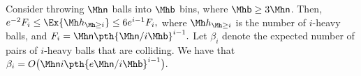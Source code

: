\begin{lemma}%
    Consider throwing $\nballs$ balls into $\nbins$ bins, where
    $\nbins \geq 3 \nballs$. Then,
    \begin{math}
        e^{-2} F_i \leq%
        \Ex{\NHX{i}} %
        \leq 6e^{i-1} F_i,
    \end{math}
    where $\NHX{i}$ is the number of $i$-heavy balls, and
    \begin{math}
        F_i = \nballs \pth{{\nballs}/{i \nbins}}^{i-1}.
    \end{math}
    Let $\beta_i$ denote the expected number of pairs of $i$-heavy
    balls that are colliding. We have that
    \begin{math}
        \beta_i = O \bigl( \nballs i \pth{{e \nballs}/{i
              \nbins}}^{i-1} \bigr).
    \end{math}
\end{lemma}
